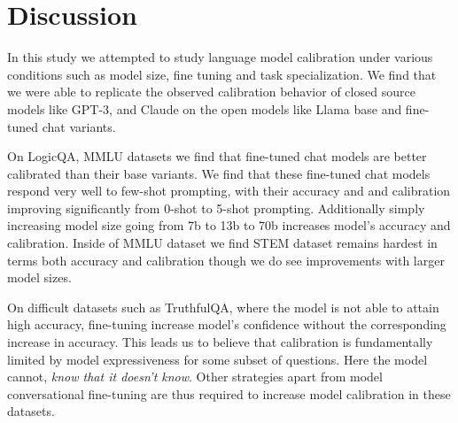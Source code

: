 \documentclass[11pt]{article}
\begin{document}
\section{Discussion}



In this study we attempted to study language model calibration  under various 
conditions such as model size, fine tuning and task specialization. We find that 
we were able to replicate the observed  calibration behavior of closed source models like 
GPT-3, and  Claude on the open models like Llama base and fine-tuned chat variants. 

On LogicQA, MMLU datasets we find that fine-tuned chat models are better calibrated than their base variants.
We find that these fine-tuned chat models respond very well to few-shot prompting, with their accuracy and and calibration improving significantly from 0-shot to 5-shot prompting. Additionally simply increasing 
model size going from 7b to 13b to 70b increases model's accuracy and calibration. Inside of MMLU dataset we find  STEM dataset remains hardest in terms both accuracy and calibration though we do see improvements with larger model sizes.

On difficult datasets such as TruthfulQA, where the 
model is not able to attain high accuracy, fine-tuning 
increase model's confidence without the corresponding 
increase in accuracy. This leads us to believe that 
calibration is fundamentally limited by model 
expressiveness for some subset of questions. Here 
the model cannot, \emph{know that it doesn't know}. Other strategies apart 
from model conversational fine-tuning are thus required to 
increase model calibration in these datasets.
\end{document}
